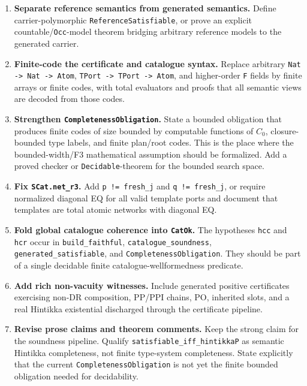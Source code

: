 \documentclass[11pt]{article}
\begin{document}
\begin{enumerate}
  \item \textbf{Separate reference semantics from generated semantics.}
        Define carrier-polymorphic \texttt{ReferenceSatisfiable}, or prove an
        explicit countable/\texttt{Occ}-model theorem bridging arbitrary
        reference models to the generated carrier.

  \item \textbf{Finite-code the certificate and catalogue syntax.}
        Replace arbitrary \texttt{Nat -> Nat -> Atom}, \texttt{TPort -> TPort -> Atom},
        and higher-order \texttt{F} fields by finite arrays or finite codes,
        with total evaluators and proofs that all semantic views are decoded
        from those codes.

  \item \textbf{Strengthen \texttt{CompletenessObligation}.}
        State a bounded obligation that produces finite codes of size bounded
        by computable functions of \(C_0\), closure-bounded type labels, and
        finite plan/root codes.  This is the place where the bounded-width/F3
        mathematical assumption should be formalized.  Add a proved checker or
        \texttt{Decidable}-theorem for the bounded search space.

  \item \textbf{Fix \texttt{SCat.net\_r3}.}
        Add \texttt{p != fresh\_j} and \texttt{q != fresh\_j}, or require
        normalized diagonal EQ for all valid template ports and document that
        templates are total atomic networks with diagonal EQ.

  \item \textbf{Fold global catalogue coherence into \texttt{CatOk}.}
        The hypotheses \texttt{hcc} and \texttt{hcr} occur in
        \texttt{build\_faithful}, \texttt{catalogue\_soundness},
        \texttt{generated\_satisfiable}, and \texttt{CompletenessObligation}.
        They should be part of a single decidable finite catalogue-wellformedness
        predicate.

  \item \textbf{Add rich non-vacuity witnesses.}
        Include generated positive certificates exercising non-DR composition,
        PP/PPI chains, PO, inherited slots, and a real Hintikka existential
        discharged through the certificate pipeline.

  \item \textbf{Revise prose claims and theorem comments.}
        Keep the strong claim for the soundness pipeline.  Qualify
        \texttt{satisfiable\_iff\_hintikkaP} as semantic Hintikka completeness,
        not finite type-system completeness.  State explicitly that the
        current \texttt{CompletenessObligation} is not yet the finite bounded
        obligation needed for decidability.
\end{enumerate}
\end{document}
